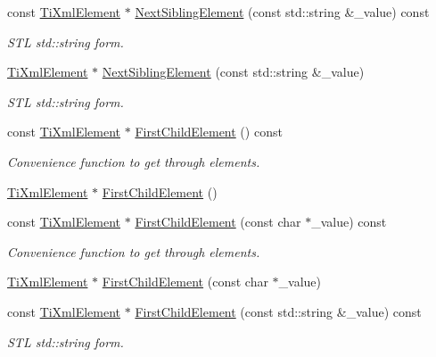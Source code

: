 \begin{DoxyCompactItemize}
\item 
const \hyperlink{class_ti_xml_element}{Ti\-Xml\-Element} $\ast$ \hyperlink{class_ti_xml_node_a7572d0af9d1e696ee3f05d8bb5ebb463}{Next\-Sibling\-Element} (const std\-::string \&\-\_\-value) const 
\begin{DoxyCompactList}\small\item\em S\-T\-L std\-::string form. \end{DoxyCompactList}\item 
\hyperlink{class_ti_xml_element}{Ti\-Xml\-Element} $\ast$ \hyperlink{class_ti_xml_node_a506958e34406729a4e4c5326ea39d081}{Next\-Sibling\-Element} (const std\-::string \&\-\_\-value)
\begin{DoxyCompactList}\small\item\em S\-T\-L std\-::string form. \end{DoxyCompactList}\item 
const \hyperlink{class_ti_xml_element}{Ti\-Xml\-Element} $\ast$ \hyperlink{class_ti_xml_node_ab1f8d8e70d88aea4c5efedfe00862d55}{First\-Child\-Element} () const 
\begin{DoxyCompactList}\small\item\em Convenience function to get through elements. \end{DoxyCompactList}\item 
\hyperlink{class_ti_xml_element}{Ti\-Xml\-Element} $\ast$ \hyperlink{class_ti_xml_node_aa0fecff1f3866ab33a8a25506e95db1d}{First\-Child\-Element} ()
\item 
const \hyperlink{class_ti_xml_element}{Ti\-Xml\-Element} $\ast$ \hyperlink{class_ti_xml_node_a0ec361bfef1cf1978d060295f597e0d9}{First\-Child\-Element} (const char $\ast$\-\_\-value) const 
\begin{DoxyCompactList}\small\item\em Convenience function to get through elements. \end{DoxyCompactList}\item 
\hyperlink{class_ti_xml_element}{Ti\-Xml\-Element} $\ast$ \hyperlink{class_ti_xml_node_a6936ae323675071808ac4840379e57f5}{First\-Child\-Element} (const char $\ast$\-\_\-value)
\item 
const \hyperlink{class_ti_xml_element}{Ti\-Xml\-Element} $\ast$ \hyperlink{class_ti_xml_node_a327ad4bbd90073c5dfc931b07314f5f7}{First\-Child\-Element} (const std\-::string \&\-\_\-value) const 
\begin{DoxyCompactList}\small\item\em S\-T\-L std\-::string form. \end{DoxyCompactList}\item 

\end{DoxyCompactItemize}
